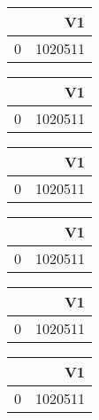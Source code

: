 \bigskip\bigskip
\centering
\begin{tabular}{rr}
  \hline
 & V1 \\ 
  \hline
0 & 1020511 \\ 
   \hline
\end{tabular}

\bigskip\bigskip
\centering
\begin{tabular}{rr}
  \hline
 & V1 \\ 
  \hline
0 & 1020511 \\ 
   \hline
\end{tabular}

\bigskip\bigskip
\centering
\begin{tabular}{rr}
  \hline
 & V1 \\ 
  \hline
0 & 1020511 \\ 
   \hline
\end{tabular}

\bigskip\bigskip
\centering
\begin{tabular}{rr}
  \hline
 & V1 \\ 
  \hline
0 & 1020511 \\ 
   \hline
\end{tabular}

\bigskip\bigskip
\centering
\begin{tabular}{rr}
  \hline
 & V1 \\ 
  \hline
0 & 1020511 \\ 
   \hline
\end{tabular}

\bigskip\bigskip
\centering
\begin{tabular}{rr}
  \hline
 & V1 \\ 
  \hline
0 & 1020511 \\ 
   \hline
\end{tabular}

